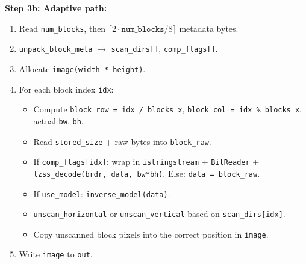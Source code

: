 \textbf{Step 3b: Adaptive path:}
\begin{enumerate}
  \item Read \texttt{num\_blocks}, then $\lceil 2 \cdot \mathtt{num\_blocks} / 8 \rceil$ metadata bytes.
  \item \texttt{unpack\_block\_meta} $\to$ \texttt{scan\_dirs[]}, \texttt{comp\_flags[]}.
  \item Allocate \texttt{image(width * height)}.
  \item For each block index \texttt{idx}:
    \begin{itemize}
      \item Compute \texttt{block\_row = idx / blocks\_x},
            \texttt{block\_col = idx \% blocks\_x}, actual \texttt{bw}, \texttt{bh}.
      \item Read \texttt{stored\_size} + raw bytes into \texttt{block\_raw}.
      \item If \texttt{comp\_flags[idx]}: wrap in \texttt{istringstream} + \texttt{BitReader}
            + \texttt{lzss\_decode(brdr, data, bw*bh)}.
            Else: \texttt{data = block\_raw}.
      \item If \texttt{use\_model}: \texttt{inverse\_model(data)}.
      \item \texttt{unscan\_horizontal} or \texttt{unscan\_vertical} based on \texttt{scan\_dirs[idx]}.
      \item Copy unscanned block pixels into the correct position in \texttt{image}.
    \end{itemize}
  \item Write \texttt{image} to \texttt{out}.
\end{enumerate}
